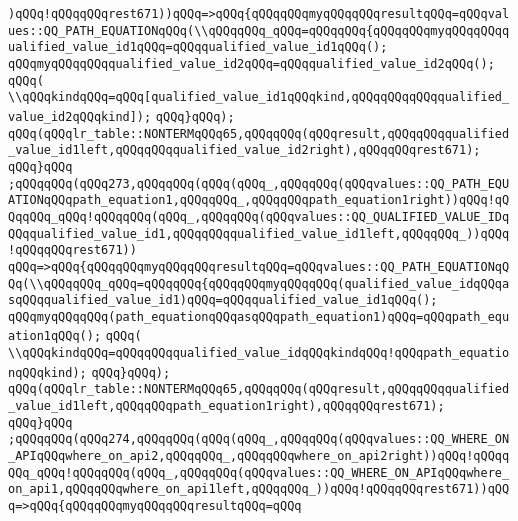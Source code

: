 \verb|)qQQq!qQQqqQQqrest671))qQQq=>qQQq{qQQqqQQqmyqQQqqQQqresultqQQq=qQQqvalues::QQ_PATH_EQUATIONqQQq(\\qQQqqQQq_qQQq=qQQqqQQq{qQQqqQQqmyqQQqqQQqqualified_value_id1qQQq=qQQqqualified_value_id1qQQq();|\newline
\verb|qQQqmyqQQqqQQqqualified_value_id2qQQq=qQQqqualified_value_id2qQQq();|\newline
\verb|qQQq(|\newline
\verb|\\qQQqkindqQQq=qQQq[qualified_value_id1qQQqkind,qQQqqQQqqQQqqualified_value_id2qQQqkind]);|\newline
\verb|qQQq}qQQq);|\newline
\verb|qQQq(qQQqlr_table::NONTERMqQQq65,qQQqqQQq(qQQqresult,qQQqqQQqqualified_value_id1left,qQQqqQQqqualified_value_id2right),qQQqqQQqrest671);|\newline
\verb|qQQq}qQQq|\newline
\verb|;qQQqqQQq(qQQq273,qQQqqQQq(qQQq(qQQq_,qQQqqQQq(qQQqvalues::QQ_PATH_EQUATIONqQQqpath_equation1,qQQqqQQq_,qQQqqQQqpath_equation1right))qQQq!qQQqqQQq_qQQq!qQQqqQQq(qQQq_,qQQqqQQq(qQQqvalues::QQ_QUALIFIED_VALUE_IDqQQqqualified_value_id1,qQQqqQQqqualified_value_id1left,qQQqqQQq_))qQQq!qQQqqQQqrest671))|\newline
\verb|qQQq=>qQQq{qQQqqQQqmyqQQqqQQqresultqQQq=qQQqvalues::QQ_PATH_EQUATIONqQQq(\\qQQqqQQq_qQQq=qQQqqQQq{qQQqqQQqmyqQQqqQQq(qualified_value_idqQQqasqQQqqualified_value_id1)qQQq=qQQqqualified_value_id1qQQq();|\newline
\verb|qQQqmyqQQqqQQq(path_equationqQQqasqQQqpath_equation1)qQQq=qQQqpath_equation1qQQq();|\newline
\verb|qQQq(|\newline
\verb|\\qQQqkindqQQq=qQQqqQQqqualified_value_idqQQqkindqQQq!qQQqpath_equationqQQqkind);|\newline
\verb|qQQq}qQQq);|\newline
\verb|qQQq(qQQqlr_table::NONTERMqQQq65,qQQqqQQq(qQQqresult,qQQqqQQqqualified_value_id1left,qQQqqQQqpath_equation1right),qQQqqQQqrest671);|\newline
\verb|qQQq}qQQq|\newline
\verb|;qQQqqQQq(qQQq274,qQQqqQQq(qQQq(qQQq_,qQQqqQQq(qQQqvalues::QQ_WHERE_ON_APIqQQqwhere_on_api2,qQQqqQQq_,qQQqqQQqwhere_on_api2right))qQQq!qQQqqQQq_qQQq!qQQqqQQq(qQQq_,qQQqqQQq(qQQqvalues::QQ_WHERE_ON_APIqQQqwhere_on_api1,qQQqqQQqwhere_on_api1left,qQQqqQQq_))qQQq!qQQqqQQqrest671))qQQq=>qQQq{qQQqqQQqmyqQQqqQQqresultqQQq=qQQq|\newline
